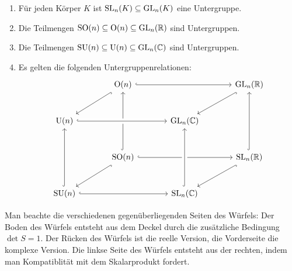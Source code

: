 \begin{proposition}
  \begin{enumerate}[leftmargin=*, label=\roman*)]
    \item
      Für jeden Körper $K$ ist $\mathrm{SL}_n(K) \subseteq \mathrm{GL}_n(K)$ eine Untergruppe.
    \item
      Die Teilmengen $\mathrm{SO}(n) \subseteq \mathrm{O}(n) \subseteq \mathrm{GL}_n(\mathbb{R})$ sind Untergruppen.
    \item
      Die Teilmengen $\mathrm{SU}(n) \subseteq \mathrm{U}(n) \subseteq \mathrm{GL}_n(\mathbb{C})$ sind Untergruppen.
    \item
      Es gelten die folgenden Untergruppenrelationen:
      \begin{equation}\label{eqn: commuting cube}
        \begin{tikzcd}[row sep = large, column sep = large]
            {}
          & \Orthogonal(n)
            \arrow[rr, hookrightarrow]
            \arrow[ld, hookrightarrow]
            \arrow[from=dd, hookrightarrow]
          & 
          & \GL_n(\Reals)
            \arrow[ld, hookrightarrow]
          \\
            \Unitary(n)
            \arrow[rr, hookrightarrow, crossing over]
          & 
          & \GL_n(\Complex)
          & 
          \\
            {}
          & \SOrthogonal(n)
            \arrow[ld, hookrightarrow]
            \arrow[rr, hookrightarrow]
          & 
          & \SL_n(\Reals)
            \arrow[ld, hookrightarrow]
            \arrow[uu, hookrightarrow]
          \\
            \SUnitary(n)
            \arrow[rr, hookrightarrow]
            \arrow[uu, hookrightarrow]
          & 
          & \SL_n(\Complex)
            \arrow[uu, hookrightarrow, crossing over]
          & 
        \end{tikzcd}
      \end{equation}
  \end{enumerate}
\end{proposition}


\begin{remark}
  Man beachte die verschiedenen gegenüberliegenden Seiten des Würfels:
  Der Boden des Würfels entsteht aus dem Deckel durch die zusätzliche Bedingung $\det S = 1$.
  Der Rücken des Würfels ist die reelle Version, die Vorderseite die komplexe Version.
  Die linkse Seite des Würfels entsteht aus der rechten, indem man Kompatiblität mit dem Skalarprodukt fordert.
\end{remark}










